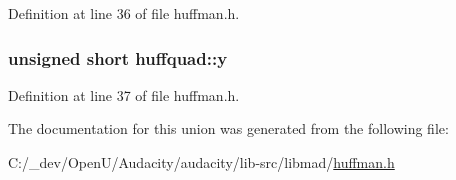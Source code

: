 Definition at line 36 of file huffman.\+h.

\subsubsection[{\texorpdfstring{y}{y}}]{\setlength{\rightskip}{0pt plus 5cm}unsigned short huffquad\+::y}\hypertarget{unionhuffquad_ab87ddc690b6cda574a61d4cf432f134a}{}\label{unionhuffquad_ab87ddc690b6cda574a61d4cf432f134a}


Definition at line 37 of file huffman.\+h.



The documentation for this union was generated from the following file\+:\begin{DoxyCompactItemize}
\item 
C\+:/\+\_\+dev/\+Open\+U/\+Audacity/audacity/lib-\/src/libmad/\hyperlink{huffman_8h}{huffman.\+h}\end{DoxyCompactItemize}
